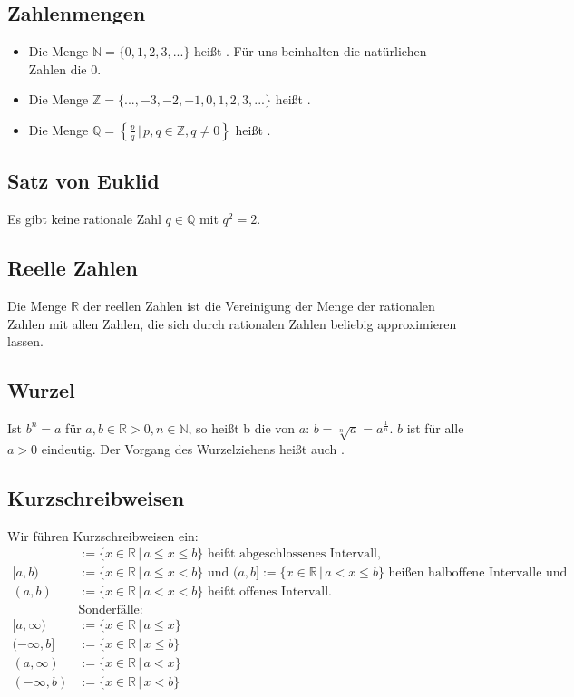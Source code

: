 \subsection{Zahlenmengen}
\begin{itemize}
\item{Die Menge $\mathbb{N} = \{0,1,2,3,...\}$ heißt . Für uns beinhalten die natürlichen Zahlen die $0$.}
\item{Die Menge $\mathbb{Z} = \{...,-3,-2,-1,0,1,2,3,...\}$ heißt .}
\item{Die Menge $\mathbb{Q} = \left\{\frac{p}{q}\,|\,p,q \in \mathbb{Z}, q \neq 0\right\}$ heißt .}
\end{itemize}

\subsection{Satz von Euklid}
Es gibt keine rationale Zahl $q \in \mathbb{Q}$ mit $q^2 = 2$.

\subsection{Reelle Zahlen}
Die Menge $\mathbb{R}$ der reellen Zahlen ist die Vereinigung der Menge der rationalen Zahlen mit allen Zahlen, die sich durch rationalen Zahlen beliebig approximieren lassen.

\subsection{Wurzel}
Ist $b^n = a$ für $a, b \in \mathbb{R} > 0, n \in \mathbb{N}$, so heißt b die  von $a$: $b = \sqrt[n]{a}=a^\frac{1}{n}$. $b$ ist für alle $a > 0$ eindeutig. Der Vorgang des Wurzelziehens heißt auch .

\subsection{Kurzschreibweisen}
Wir führen Kurzschreibweisen ein:
\begin{align*}
[a,b] &:= \{x\in\mathbb{R}\,|\,a \leq x \leq b\}\text{ heißt abgeschlossenes Intervall,} \\
[a,b) &:= \{x\in\mathbb{R}\,|\,a \leq x < b\}\text{ und }(a,b] := \{x\in\mathbb{R}\,|\,a < x \leq b\}\text{ heißen halboffene Intervalle und} \\
(a,b) &:= \{x\in\mathbb{R}\,|\,a < x < b\}\text{ heißt offenes Intervall.} \\
&\text{Sonderfälle:} \\
[a, \infty) &:= \{x\in\mathbb{R}\,|\,a \leq x\} \\
(-\infty, b] &:= \{x\in\mathbb{R}\,|\,x \leq b\} \\
(a, \infty) &:= \{x\in\mathbb{R}\,|\,a < x\} \\
(-\infty, b) &:= \{x\in\mathbb{R}\,|\,x < b\}
\end{align*}

